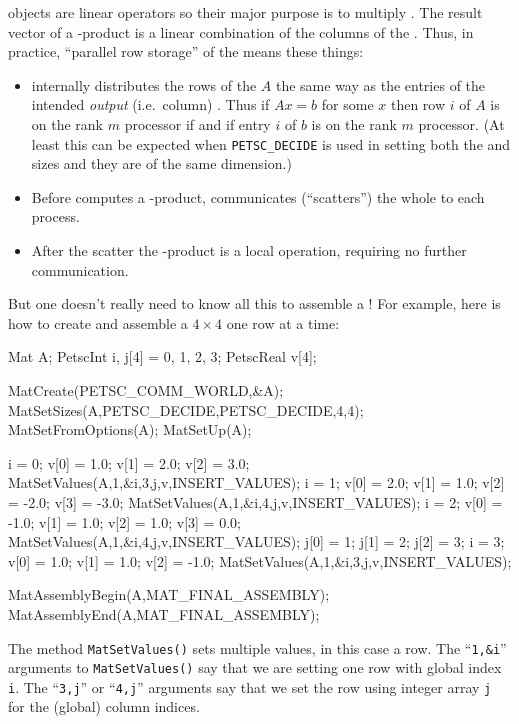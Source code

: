 \pMat objects are linear operators so their major purpose is to multiply \pVecs.  The result vector of a \pMat-\pVec product is a linear combination of the columns of the \pMat.  Thus, in practice, ``parallel row storage'' of the \pMat means these things:
\begin{itemize}
\item \PETSc internally distributes the rows of the \pMat $A$ the same way as the entries of the intended \emph{output} (i.e.~column) \pVec.  Thus if $Ax=b$ for some $x$ then row $i$ of $A$ is on the rank $m$ processor if and if entry $i$ of $b$ is on the rank $m$ processor.  (At least this can be expected when \texttt{PETSC\_DECIDE} is used in setting both the \pVec and \pMat sizes and they are of the same dimension.)
\item Before \PETSc computes a \pMat-\pVec product, \PETSc communicates (``scatters'') the whole \pVec to each process.
\item After the scatter the \pMat-\pVec product is a local operation, requiring no further communication.
\end{itemize}

But one doesn't really need to know all this to assemble a \pMat!  For example, here is how to create and assemble a $4\times 4$ \pMat one row at a time:
\begin{code}
Mat A;
PetscInt  i, j[4] = {0, 1, 2, 3};
PetscReal v[4];

MatCreate(PETSC_COMM_WORLD,&A);
MatSetSizes(A,PETSC_DECIDE,PETSC_DECIDE,4,4);
MatSetFromOptions(A);
MatSetUp(A);

i = 0;  v[0] = 1.0;  v[1] = 2.0;  v[2] = 3.0;
MatSetValues(A,1,&i,3,j,v,INSERT_VALUES);
i = 1;  v[0] = 2.0;  v[1] = 1.0;  v[2] = -2.0;  v[3] = -3.0;
MatSetValues(A,1,&i,4,j,v,INSERT_VALUES);
i = 2;  v[0] = -1.0;  v[1] = 1.0;  v[2] = 1.0;  v[3] = 0.0;
MatSetValues(A,1,&i,4,j,v,INSERT_VALUES);
j[0] = 1;  j[1] = 2;  j[2] = 3;
i = 3;  v[0] = 1.0;  v[1] = 1.0;  v[2] = -1.0;
MatSetValues(A,1,&i,3,j,v,INSERT_VALUES);

MatAssemblyBegin(A,MAT_FINAL_ASSEMBLY);
MatAssemblyEnd(A,MAT_FINAL_ASSEMBLY);
\end{code}
The method \texttt{MatSetValues()} sets multiple values, in this case a row.  The ``\texttt{1,\&i}'' arguments to \texttt{MatSetValues()} say that we are setting one row with global index \texttt{i}.  The ``\texttt{3,j}'' or ``\texttt{4,j}'' arguments say that we set the row using integer array \texttt{j} for the (global) column indices.

